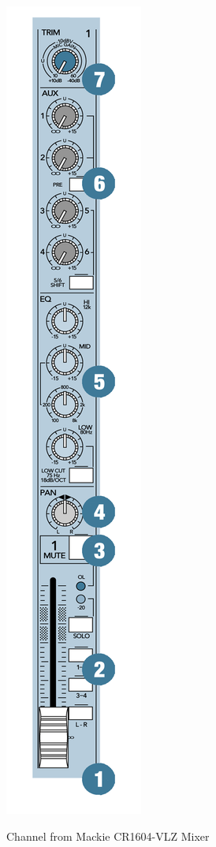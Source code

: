 \documentclass{tufte-book} %
\begin{document}
\begin{marginfigure}
\includegraphics[width=\linewidth]{Mackie.png}
\caption{Channel from Mackie CR1604-VLZ Mixer}
\label{fig:marginfig}
\end{marginfigure}
\end{document}
